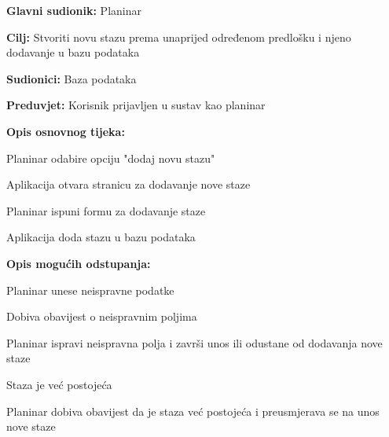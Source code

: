 			\noindent {}
		\begin{packed_item}
			
			\item \textbf{Glavni sudionik: }$ $Planinar$ $
			\item  \textbf{Cilj:} $ $Stvoriti novu stazu prema unaprijed određenom predlošku i njeno dodavanje u bazu podataka$ $
			\item  \textbf{Sudionici:} $ $Baza podataka$ $
			\item  \textbf{Preduvjet:} $ $Korisnik prijavljen u sustav kao planinar$ $
			\item  \textbf{Opis osnovnog tijeka:}
			
			\item[] \begin{packed_enum}
				
				\item $ $Planinar odabire opciju "dodaj novu stazu"$ $
				\item $ $Aplikacija otvara stranicu za dodavanje nove staze $ $
				\item $ $Planinar ispuni formu za dodavanje staze$ $	
				\item $ $Aplikacija doda stazu u bazu podataka$ $
			\end{packed_enum}
		\item  \textbf{Opis mogućih odstupanja:}
		
		\item[] \begin{packed_item}
			
			\item[3.a] $ $Planinar unese neispravne podatke$ $
			\item[] \begin{packed_enum}
				
				\item $ $Dobiva obavijest o neispravnim poljima$ $
				\item $ $Planinar ispravi neispravna polja i završi unos ili odustane od dodavanja nove staze$ $
			\end{packed_enum}
			\item[4.a] $ $Staza je već postojeća$ $
			\item[] \begin{packed_enum}
				\item $ $Planinar dobiva obavijest da je staza već postojeća i preusmjerava se na unos nove staze$ $
		\end{packed_enum}
		\end{packed_item}
		\end{packed_item}
		
